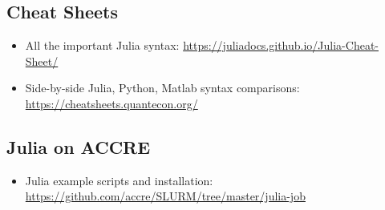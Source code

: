 \documentclass[12pt]{article}
\begin{document}
\subsection*{Cheat Sheets}
\begin{itemize}
    \item All the important Julia syntax: \url{https://juliadocs.github.io/Julia-Cheat-Sheet/}
    \item Side-by-side Julia, Python, Matlab syntax comparisons: \url{https://cheatsheets.quantecon.org/}
\end{itemize}


\subsection*{Julia on ACCRE}
\begin{itemize}
    \item Julia example scripts and installation: \url{https://github.com/accre/SLURM/tree/master/julia-job}
\end{itemize}
\end{document}
